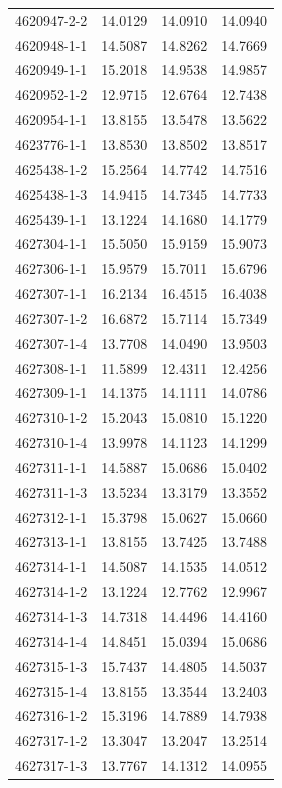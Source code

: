 \begin{longtable}{lrrr}
4620947-2-2 & 14.0129 & 14.0910 & 14.0940 \\
4620948-1-1 & 14.5087 & 14.8262 & 14.7669 \\
4620949-1-1 & 15.2018 & 14.9538 & 14.9857 \\
4620952-1-2 & 12.9715 & 12.6764 & 12.7438 \\
4620954-1-1 & 13.8155 & 13.5478 & 13.5622 \\
4623776-1-1 & 13.8530 & 13.8502 & 13.8517 \\
4625438-1-2 & 15.2564 & 14.7742 & 14.7516 \\
4625438-1-3 & 14.9415 & 14.7345 & 14.7733 \\
4625439-1-1 & 13.1224 & 14.1680 & 14.1779 \\
4627304-1-1 & 15.5050 & 15.9159 & 15.9073 \\
4627306-1-1 & 15.9579 & 15.7011 & 15.6796 \\
4627307-1-1 & 16.2134 & 16.4515 & 16.4038 \\
4627307-1-2 & 16.6872 & 15.7114 & 15.7349 \\
4627307-1-4 & 13.7708 & 14.0490 & 13.9503 \\
4627308-1-1 & 11.5899 & 12.4311 & 12.4256 \\
4627309-1-1 & 14.1375 & 14.1111 & 14.0786 \\
4627310-1-2 & 15.2043 & 15.0810 & 15.1220 \\
4627310-1-4 & 13.9978 & 14.1123 & 14.1299 \\
4627311-1-1 & 14.5887 & 15.0686 & 15.0402 \\
4627311-1-3 & 13.5234 & 13.3179 & 13.3552 \\
4627312-1-1 & 15.3798 & 15.0627 & 15.0660 \\
4627313-1-1 & 13.8155 & 13.7425 & 13.7488 \\
4627314-1-1 & 14.5087 & 14.1535 & 14.0512 \\
4627314-1-2 & 13.1224 & 12.7762 & 12.9967 \\
4627314-1-3 & 14.7318 & 14.4496 & 14.4160 \\
4627314-1-4 & 14.8451 & 15.0394 & 15.0686 \\
4627315-1-3 & 15.7437 & 14.4805 & 14.5037 \\
4627315-1-4 & 13.8155 & 13.3544 & 13.2403 \\
4627316-1-2 & 15.3196 & 14.7889 & 14.7938 \\
4627317-1-2 & 13.3047 & 13.2047 & 13.2514 \\
4627317-1-3 & 13.7767 & 14.1312 & 14.0955 \\

\end{longtable}
